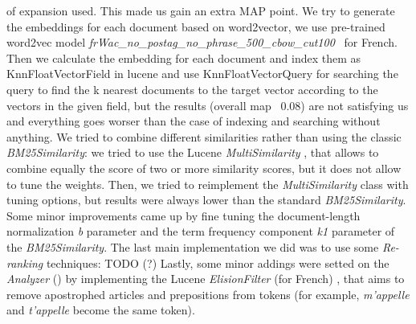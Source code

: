 of expansion used. This made us gain an extra \ac{MAP} point.
\newline
We try to generate the embeddings for each document based on word2vector, we use pre-trained word2vec model \textit{frWac\_no\_postag\_no\_phrase\_500\_cbow\_cut100}~\cite{fauconnier_2015} for French. Then we calculate the embedding for each document and index them as KnnFloatVectorField in lucene and use KnnFloatVectorQuery for searching the query to find the k nearest documents to the target vector according to the vectors in the given field, but the results (overall map ~0.08) are not satisfying us and everything goes worser than the case of indexing and searching without anything.
We tried to combine different similarities rather than using the classic \textit{BM25Similarity}: we tried to use the Lucene \textit{MultiSimilarity} \cite{lucenemultisimilarity}, that allows to combine equally the score of two or more similarity scores, but it does not allow to
tune the weights. Then, we tried to reimplement the \textit{MultiSimilarity} class with tuning options, but results were always lower than the standard \textit{BM25Similarity}. Some minor improvements came up by fine tuning the document-length
normalization \textit{b} parameter and the term frequency component \textit{k1} parameter of the \textit{BM25Similarity}.
The last main implementation we did was to use some \textit{Re-ranking} techniques: TODO (?) 
Lastly, some minor addings were setted on the \textit{Analyzer} (\cite{analyzer_subsec}) by implementing the Lucene \textit{ElisionFilter} (for French) \cite{luceneelisionfilter}, that aims to remove apostrophed articles and prepositions from tokens (for example, \textit{m'appelle} and \textit{t'appelle} become the same token).




